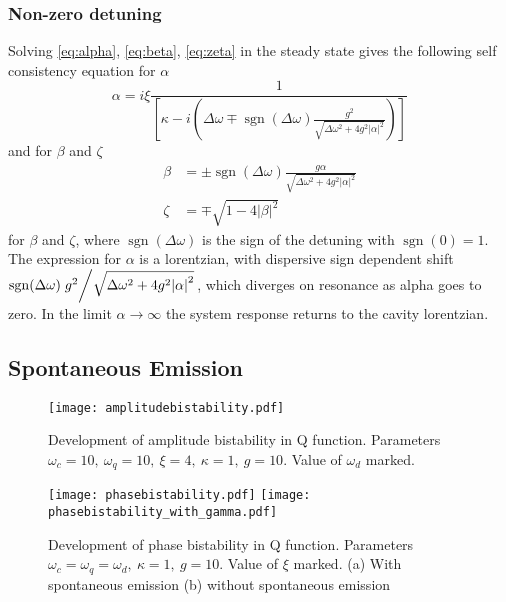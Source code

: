 \subsubsection{Non-zero detuning}
Solving \cref{eq:alpha}, \cref{eq:beta}, \cref{eq:zeta} in the steady state gives the following self consistency equation for $\alpha$
\begin{equation}
  \alpha = i \xi\frac{1}{\left[\kappa-i\left(\Delta \omega \mp \operatorname{sgn}(\Delta \omega) \frac{g^2}{\sqrt{\Delta \omega^2 +4g^2 |\alpha|^2}}\right)\right]}
\end{equation}
and for $\beta$ and $\zeta$
\begin{align}
  \beta& = \pm \operatorname{sgn}(\Delta \omega) \frac{g \alpha}{\sqrt{\Delta \omega^2 + 4 g^2 |\alpha|^2}}\\
  \zeta& = \mp \sqrt{1-4|\beta|^2}
\end{align}
for $\beta$ and $\zeta$, where $\operatorname{sgn}(\Delta \omega)$ is the sign of the detuning with $\operatorname{sgn}(0) = 1$.
The expression for $\alpha$ is a lorentzian, with dispersive sign dependent shift $ \operatorname{sgn}(\Delta\omega)\flatfrac{g^2}{\sqrt{\Delta\omega^2+4g^2\abs{\alpha}^2}}$, which diverges on resonance as alpha goes to zero. 
In the limit $\alpha \rightarrow \infty$ the system response returns to the cavity lorentzian.

\subsection{Spontaneous Emission}
\begin{figure*}[bht]
  \texttt{[image: amplitudebistability.pdf]}
  \caption{Development of amplitude bistability in Q function. Parameters $\omega_c=10,\ \omega_q=10,\ \xi=4,\ \kappa=1,\ g=10$. Value of $\omega_d$ marked.}
  \label{amplitudebistability}
\end{figure*}
\begin{figure*}[tbh]
  \texttt{[image: phasebistability.pdf]}
  \texttt{[image: phasebistability\_with\_gamma.pdf]}
  \caption{Development of phase bistability in Q function. Parameters $\omega_c = \omega_q = \omega_d ,\ \kappa=1,\ g=10$. Value of $\xi$ marked. (a) With spontaneous emission (b) without spontaneous emission}
  \label{phasebistability}
\end{figure*}

